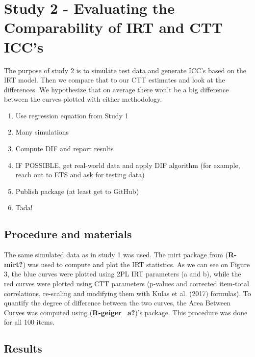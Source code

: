 \documentclass[
  man]{apa6}
\providecommand{\tightlist}{%
  \setlength{\itemsep}{0pt}\setlength{\parskip}{0pt}}
\begin{document}
\hypertarget{study-2---evaluating-the-comparability-of-irt-and-ctt-iccs}{%
\section{Study 2 - Evaluating the Comparability of IRT and CTT ICC's}\label{study-2---evaluating-the-comparability-of-irt-and-ctt-iccs}}

The purpose of study 2 is to simulate test data and generate ICC's based on the IRT model. Then we compare that to our CTT estimates and look at the differences. We hypothesize that on average there won't be a big difference between the curves plotted with either methodology.

\begin{enumerate}
\def\labelenumi{\arabic{enumi}.}
\tightlist
\item
  Use regression equation from Study 1
\item
  Many simulations
\item
  Compute DIF and report results
\item
  IF POSSIBLE, get real-world data and apply DIF algorithm (for example, reach out to ETS and ask for testing data)
\item
  Publish package (at least get to GitHub)
\item
  Tada!
\end{enumerate}

\hypertarget{procedure-and-materials}{%
\subsection{Procedure and materials}\label{procedure-and-materials}}

The same simulated data as in study 1 was used. The mirt package from (\textbf{R-mirt?}) was used to compute and plot the IRT statistics. As we can see on Figure 3, the blue curves were plotted using 2PL IRT parameters (a and b), while the red curves were plotted using CTT parameters (p-values and corrected item-total correlations, re-scaling and modifying them with Kulas et al. (2017) formulas). To quantify the degree of difference between the two curves, the Area Between Curves was computed using (\textbf{R-geiger\_a?})'s package. This procedure was done for all 100 items.

\hypertarget{results-1}{%
\subsection{Results}\label{results-1}}
\end{document}
